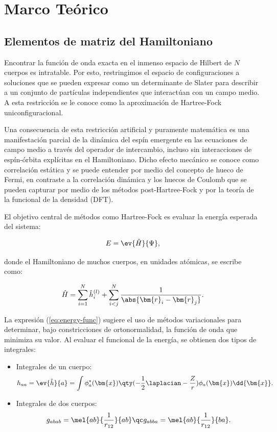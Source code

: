 \chapter{Marco Teórico}

\section{Elementos de matriz del Hamiltoniano}

Encontrar la función de onda exacta en el inmenso espacio de Hilbert de \( N \) cuerpos es intratable. Por esto, restringimos el espacio de configuraciones a soluciones que se pueden expresar como un determinante de Slater para describir a un conjunto de partículas independientes que interactúan con un campo medio. A esta restricción se le conoce como la aproximación de Hartree-Fock uniconfiguracional.

Una consecuencia de esta restricción artificial y puramente matemática es una manifestación parcial de la dinámica del espín emergente en las ecuaciones de campo medio a través del operador de intercambio, incluso sin interacciones de espín-órbita explícitas en el Hamiltoniano. Dicho efecto mecánico se conoce como correlación estática y se puede entender por medio del concepto de hueco de Fermi, en contraste a la correlación dinámica y los huecos de Coulomb que se pueden capturar por medio de los métodos post-Hartree-Fock y por la teoría de la funcional de la densidad (DFT).

El objetivo central de métodos como Hartree-Fock es evaluar la energía esperada del sistema:

\begin{equation}
  \label{eq:energy-func}
  E = \ev{\hat{H}}{\Psi},
\end{equation}

donde el Hamiltoniano de muchos cuerpos, en unidades atómicas, se escribe como:

\begin{equation}
  \label{eq:hamiltonian-mb}
  \hat{H} = \sum_{i=1}^N \hat{h}_i^{(l)} + \sum_{i<j}^N \frac{1}{\abs{\bm{r}_i-\bm{r}_j}}.
\end{equation}

La expresión (\ref{eq:energy-func}) sugiere el uso de métodos variacionales para determinar, bajo constricciones de ortonormalidad, la función de onda que minimiza su valor. Al evaluar el funcional de la energía, se obtienen dos tipos de integrales:

\begin{itemize}
\item Integrales de un cuerpo:
  \begin{equation}
    \label{eq:one-body}
    h_{aa} = \ev{\hat{h}}{a} = \int \phi_a^{*}(\bm{x}) \qty(-\frac{1}{2}\laplacian - \frac{Z}{r})\phi_a(\bm{x}) \dd{\bm{x}}.
  \end{equation}
\item Integrales de dos cuerpos:
  \begin{equation}
    \label{eq:two-body}
    g_{abab} = \mel{ab}{\frac{1}{r_{12}}}{ab} \qc g_{abba} = \mel{ab}{\frac{1}{r_{12}}}{ba}.
  \end{equation}
\end{itemize}

